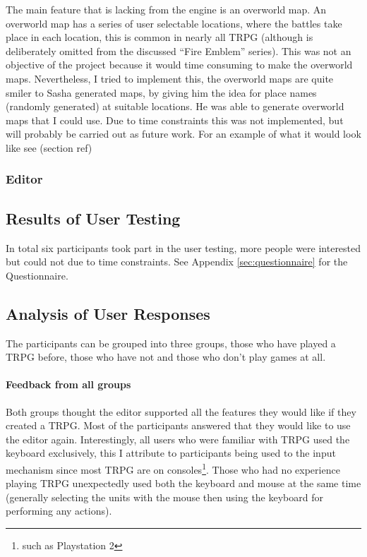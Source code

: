 The main feature that is lacking from the engine is an overworld map. An overworld map has a series of user selectable locations, where the battles take place in each location, this is common in nearly all TRPG (although is deliberately omitted from the discussed ``Fire Emblem'' series). This was not an objective of the project because it would time consuming to make the overworld maps. Nevertheless, I tried to implement this, the overworld maps are quite smiler to  Sasha generated maps, by giving him the idea for place names (randomly generated) at suitable locations.  He was able to generate overworld maps that I could use. Due to time constraints this was not implemented, but will probably be carried out as future work. For an example of what it would look like see (section ref)
\subsubsection{Editor}
\label{ssub:editor}


\subsection{Results of User Testing}
\label{sub:results_of_user_testing}

In total six participants took part in the user testing, more people were interested but could not due to time constraints.  See Appendix \ref{sec:questionnaire} for the Questionnaire.

\subsection{Analysis of User Responses}
The participants can be grouped into three groups, those who have played a TRPG before, those who have not and those who don't play games at all.
\paragraph{Feedback from  all groups\\}
Both groups thought the editor supported all the features they would like if they created a TRPG.  Most of the participants answered that they would like to use the editor again.  Interestingly, all users who were familiar with TRPG used the keyboard exclusively, this I attribute to participants being used to the input mechanism since most TRPG are on consoles\footnote{such as Playstation 2}. Those who had no experience playing TRPG unexpectedly used both the keyboard and mouse at the same time (generally selecting the units with the mouse then using the keyboard for performing any actions).


